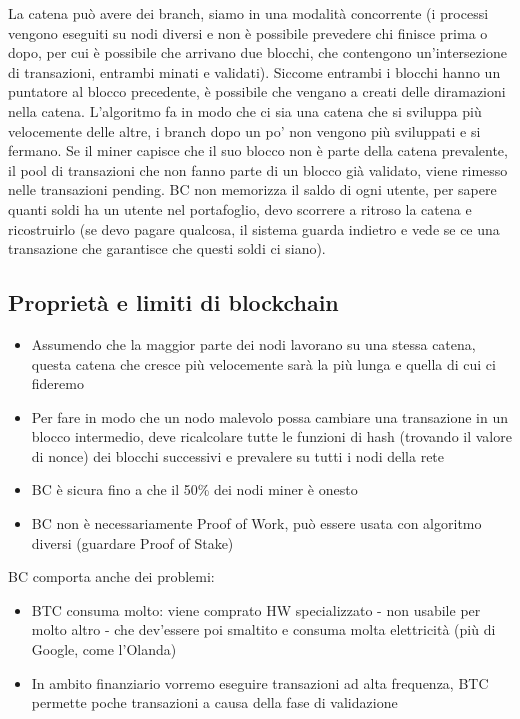 \documentclass[12pt,italian]{report}
\begin{document}
\bigbreak
La catena può avere dei branch, siamo in una modalità concorrente (i processi vengono eseguiti su nodi diversi e non è possibile prevedere chi finisce prima o dopo, per cui è possibile che arrivano due blocchi, che contengono un'intersezione di transazioni, entrambi minati e validati). Siccome entrambi i blocchi hanno un puntatore al blocco precedente, è possibile che vengano a creati delle diramazioni nella catena. L'algoritmo fa in modo che ci sia una catena che si sviluppa più velocemente delle altre, i branch dopo un po' non vengono più sviluppati e si fermano. Se il miner capisce che il suo blocco non è parte della catena prevalente, il pool di transazioni che non fanno parte di un blocco già validato, viene rimesso nelle transazioni pending. 
\bigbreak
BC non memorizza il saldo di ogni utente, per sapere quanti soldi ha un utente nel portafoglio, devo scorrere a ritroso la catena e ricostruirlo (se devo pagare qualcosa, il sistema guarda indietro e vede se ce una transazione che garantisce che questi soldi ci siano). 

\subsection{Proprietà e limiti di blockchain}
\begin{itemize}
    \item Assumendo che la maggior parte dei nodi lavorano su una stessa catena, questa catena che cresce più velocemente sarà la più lunga e quella di cui ci fideremo
    \item Per fare in modo che un nodo malevolo possa cambiare una transazione in un blocco intermedio, deve ricalcolare tutte le funzioni di hash (trovando il valore di nonce) dei blocchi successivi e prevalere su tutti i nodi della rete
    \item BC è sicura fino a che il 50\% dei nodi miner è onesto
    \item BC non è necessariamente Proof of Work, può essere usata con algoritmo diversi (guardare Proof of Stake)
\end{itemize}
BC comporta anche dei problemi:
\begin{itemize}
    \item BTC consuma molto: viene comprato HW specializzato - non usabile per molto altro - che dev'essere poi smaltito e consuma molta elettricità (più di Google, come l'Olanda)
    \item In ambito finanziario vorremo eseguire transazioni ad alta frequenza, BTC permette poche transazioni a causa della fase di validazione
\end{itemize}
\end{document}
